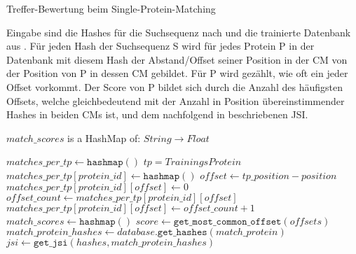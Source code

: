 \begin{enumerate}[a)]
                \newcommand{\Width}{\dimexpr\textwidth-\leftmargin}
                \begin{minipage}{\Width}
                    \begin{algorithm}[H]
                        \caption{Treffer-Bewertung beim Single-Protein-Matching}\label{alg:scoring}
                        Eingabe sind die Hashes für die Suchsequenz nach  und die trainierte Datenbank aus . Für jeden Hash der Suchsequenz S wird für jedes Protein P in der Datenbank mit diesem Hash der Abstand/Offset seiner Position in der \acf{CM} von der Position von P in dessen \acs{CM} gebildet. Für P wird gezählt, wie oft ein jeder Offset vorkommt. Der Score von P bildet sich durch die Anzahl des häufigsten Offsets, welche gleichbedeutend mit der Anzahl in Position übereinstimmender Hashes in beiden \acp{CM} ist, und dem nachfolgend in  beschriebenen \acl{JSI}.
                        \begin{algorithmic}[1]
                            \Ensure $match\_scores$ is a HashMap of: $String \rightarrow Float$

                            \State $matches\_per\_tp \gets \texttt{hashmap}()$ \Comment $tp=Trainings Protein$
                                            \State $matches\_per\_tp[protein\_id] \gets \texttt{hashmap}()$
                                        \EndIf
                                        \State $offset \gets tp\_position - position$
                                            \State $matches\_per\_tp[protein\_id][offset] \gets 0$
                                        \EndIf
                                        \State $offset\_count \gets matches\_per\_tp[protein\_id][offset]$
                                        \State $matches\_per\_tp[protein\_id][offset] \gets offset\_count + 1$
                                    \EndFor
                                \EndIf
                            \EndFor
                            \State $match\_scores \gets \texttt{hashmap}()$
                                \State $score \gets \texttt{get\_most\_common\_offset}(offsets)$
                                \State $match\_protein\_hashes \gets database.\texttt{get\_hashes}(match\_protein)$
                                \State $jsi \gets \texttt{get\_jsi}(hashes, match\_protein\_hashes)$


\end{algorithmic}
\end{algorithm}
\end{minipage}
\end{enumerate}

